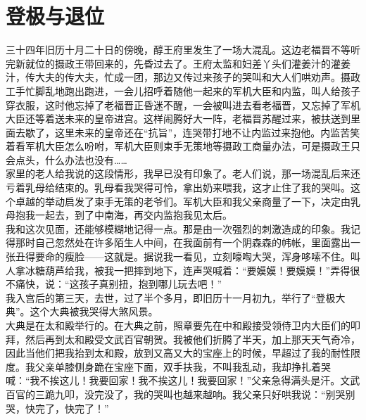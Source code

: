 \fancyhead[RO]{} %
\fancyhead[LE]{} %
\chapter*{登极与退位}
\thispagestyle{empty}
三十四年旧历十月二十日的傍晚，醇王府里发生了一场大混乱。这边老福晋不等听完新就位的摄政王带回来的，先昏过去了。王府太监和妇差丫头们灌姜汁的灌姜汁，传大夫的传大夫，忙成一团，那边又传过来孩子的哭叫和大人们哄劝声。摄政工手忙脚乱地跑出跑进，一会儿招呼着随他一起来的军机大臣和内监，叫人给孩子穿衣服，这时他忘掉了老福晋正昏迷不醒，一会被叫进去看老福晋，又忘掉了军机大臣还等着送未来的皇帝进宫。这样闹腾好大一阵，老福晋苏醒过来，被扶送到里面去歇了，这里未来的皇帝还在“抗旨”，连哭带打地不让内监过来抱他。内监苦笑着看军机大臣怎么吩咐，军机大臣则束手无策地等摄政工商量办法，可是摄政王只会点头，什么办法也没有……\\

家里的老人给我说的这段情形，我早已没有印象了。老人们说，那一场混乱后来还亏着乳母给结束的。乳母看我哭得可怜，拿出奶来喂我，这才止住了我的哭叫。这个卓越的举动启发了束手无策的老爷们。军机大臣和我父亲商量了一下，决定由乳母抱我一起去，到了中南海，再交内监抱我见太后。\\

我和这次见面，还能够模糊地记得一点。那是由一次强烈的刺激造成的印象。我记得那时自己忽然处在许多陌生人中间，在我面前有一个阴森森的帏帐，里面露出一张丑得要命的瘦脸——这就是。据说我一看见，立刻嚎啕大哭，浑身哆嗦不住。叫人拿冰糖葫芦给我，被我一把摔到地下，连声哭喊着：“要嫫嫫！要嫫嫫！”弄得很不痛快，说：“这孩子真别扭，抱到哪儿玩去吧！”\\

我入宫后的第三天，去世，过了半个多月，即旧历十一月初九，举行了“登极大典”。这个大典被我哭得大煞风景。\\

大典是在太和殿举行的。在大典之前，照章要先在中和殿接受领侍卫内大臣们的叩拜，然后再到太和殿受文武百官朝贺。我被他们折腾了半天，加上那天天气奇冷，因此当他们把我抬到太和殿，放到又高又大的宝座上的时候，早超过了我的耐性限度。我父亲单膝侧身跪在宝座下面，双手扶我，不叫我乱动，我却挣扎着哭喊：“我不挨这儿！我要回家！我不挨这儿！我要回家！”父亲急得满头是汗。文武百官的三跪九叩，没完没了，我的哭叫也越来越响。我父亲只好哄我说：“别哭别哭，快完了，快完了！”\\

